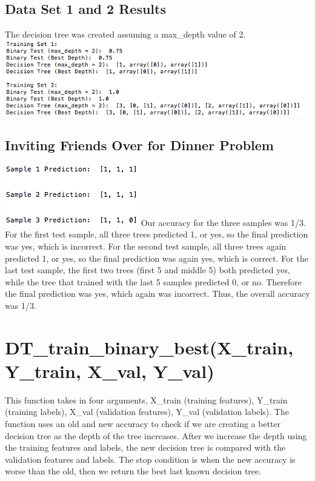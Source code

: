 \documentclass{article}
\begin{document}
\subsection{Data Set 1 and 2 Results}
The decision tree was created assuming a max\_depth value of 2.
\newline
\includegraphics[scale=0.75]{Decision_Tree_Main.png}

\subsection{Inviting Friends Over for Dinner Problem}
\includegraphics[scale = 0.75]{Friends_Prediction.png}
\newline \newline Our accuracy for the three samples was 1/3. For the first test sample, all three trees predicted 1, or yes, so the final prediction was yes, which is incorrect. For the second test sample, all three trees again predicted 1, or yes, so the final prediction was again yes, which is correct. For the last test sample, the first two trees (first 5 and middle 5) both predicted yes, while the tree that trained with the last 5 samples predicted 0, or no. Therefore the final prediction was yes, which again was incorrect. Thus, the overall accuracy was 1/3.

\section{DT\_train\_binary\_best(X\_train, Y\_train, X\_val, Y\_val)}
This function takes in four arguments, X\_train (training features), Y\_train (training labels), X\_val (validation features), Y\_val (validation labels). The function uses an old and new accuracy to check if we are creating a better decision tree as the depth of the tree increases. After we increase the depth using the training features and labels, the new decision tree is compared with the validation features and labels. The stop condition is when the new accuracy is worse than the old, then we return the best last known decision tree.
\end{document}
